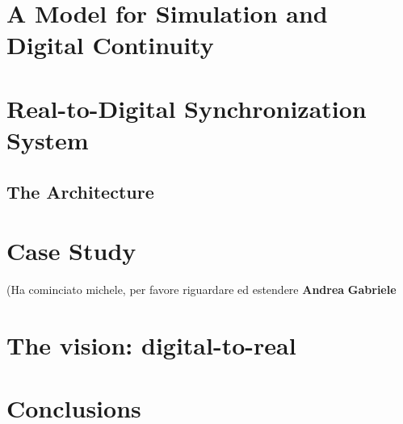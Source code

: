 \documentclass{riverk}
\begin{document}
\section{A Model for Simulation and Digital Continuity}\label{sec:model}




\section{Real-to-Digital Synchronization System}


\subsection{The Architecture}\label{sec:architecture}




\section{Case Study}\label{sec:caseStudy}
(Ha cominciato michele, per favore riguardare ed estendere \textbf{Andrea} \textbf{Gabriele}


\section{The vision: digital-to-real}


\section{Conclusions}







\end{document}
